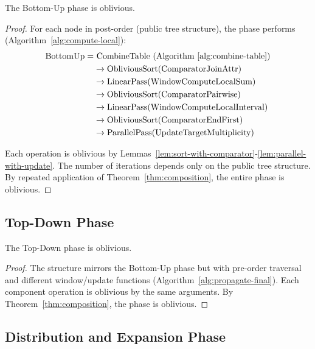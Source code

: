 \begin{lemma}
\label{lem:bottom-up-oblivious}
The Bottom-Up phase is oblivious.
\end{lemma}

\begin{proof}
For each node in post-order (public tree structure), the phase performs (Algorithm~\ref{alg:compute-local}):
\begin{align}
\text{BottomUp} = &\text{ CombineTable (Algorithm~\ref{alg:combine-table})} \nonumber \\
&\rightarrow \text{ObliviousSort(ComparatorJoinAttr)} \nonumber \\
&\rightarrow \text{LinearPass(WindowComputeLocalSum)} \nonumber \\
&\rightarrow \text{ObliviousSort(ComparatorPairwise)} \nonumber \\
&\rightarrow \text{LinearPass(WindowComputeLocalInterval)} \nonumber \\
&\rightarrow \text{ObliviousSort(ComparatorEndFirst)} \nonumber \\
&\rightarrow \text{ParallelPass(UpdateTargetMultiplicity)} \nonumber
\end{align}

Each operation is oblivious by Lemmas~\ref{lem:sort-with-comparator}-\ref{lem:parallel-with-update}. The number of iterations depends only on the public tree structure. By repeated application of Theorem~\ref{thm:composition}, the entire phase is oblivious.\end{proof}

\subsection{Top-Down Phase}

\begin{lemma}
\label{lem:top-down-oblivious}
The Top-Down phase is oblivious.
\end{lemma}

\begin{proof}
The structure mirrors the Bottom-Up phase but with pre-order traversal and different window/update functions (Algorithm~\ref{alg:propagate-final}). Each component operation is oblivious by the same arguments. By Theorem~\ref{thm:composition}, the phase is oblivious.\end{proof}

\subsection{Distribution and Expansion Phase}

